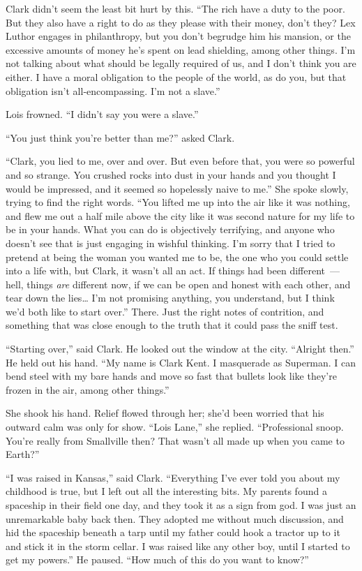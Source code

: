 Clark didn't seem the least bit hurt by this. ``The rich have a duty to
the poor. But they also have a right to do as they please with their
money, don't they? Lex Luthor engages in philanthropy, but you don't
begrudge him his mansion, or the excessive amounts of money he's spent
on lead shielding, among other things. I'm not talking about what should
be legally required of us, and I don't think you are either. I have a
moral obligation to the people of the world, as do you, but that
obligation isn't all‐encompassing. I'm not a slave.''

Lois frowned. ``I didn't say you were a slave.''

``You just think you're better than me?'' asked Clark.

``Clark, you lied to me, over and over. But even before that, you were
so powerful and so strange. You crushed rocks into dust in your hands
and you thought I would be impressed, and it seemed so hopelessly naive
to me.'' She spoke slowly, trying to find the right words. ``You lifted
me up into the air like it was nothing, and flew me out a half mile
above the city like it was second nature for my life to be in your
hands. What you can do is objectively terrifying, and anyone who doesn't
see that is just engaging in wishful thinking. I'm sorry that I tried to
pretend at being the woman you wanted me to be, the one who you could
settle into a life with, but Clark, it wasn't all an act. If things had
been different~--- hell, things \emph{are} different now, if we can be
open and honest with each other, and tear down the lies\ldots{} I'm not
promising anything, you understand, but I think we'd both like to start
over.'' There. Just the right notes of contrition, and something that
was close enough to the truth that it could pass the sniff test.

``Starting over,'' said Clark. He looked out the window at the city.
``Alright then.'' He held out his hand. ``My name is Clark Kent. I
masquerade as Superman. I can bend steel with my bare hands and move so
fast that bullets look like they're frozen in the air, among other
things.''

She shook his hand. Relief flowed through her; she'd been worried that
his outward calm was only for show. ``Lois Lane,'' she replied.
``Professional snoop. You're really from Smallville then? That wasn't
all made up when you came to Earth?''

``I was raised in Kansas,'' said Clark. ``Everything I've ever told you
about my childhood is true, but I left out all the interesting bits. My
parents found a spaceship in their field one day, and they took it as a
sign from god. I was just an unremarkable baby back then. They adopted
me without much discussion, and hid the spaceship beneath a tarp until
my father could hook a tractor up to it and stick it in the storm
cellar. I was raised like any other boy, until I started to get my
powers.'' He paused. ``How much of this do you want to know?''

